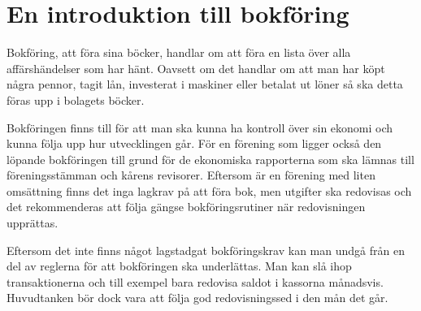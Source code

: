 \chapter{En introduktion till bokföring}
Bokföring, att föra sina böcker, handlar om att föra en lista över alla affärshändelser som har hänt. Oavsett om det handlar om att man har köpt några pennor, tagit lån, investerat i maskiner eller betalat ut löner så ska detta föras upp i bolagets böcker.

Bokföringen finns till för att man ska kunna ha kontroll över sin ekonomi och kunna följa upp hur utvecklingen går. För en förening som  ligger också den löpande bokföringen till grund för de ekonomiska rapporterna som ska lämnas till föreningsstämman och kårens revisorer. Eftersom  är en förening med liten omsättning finns det inga lagkrav på att föra bok, men utgifter ska redovisas och det rekommenderas att följa gängse bokföringsrutiner när redovisningen upprättas.


Eftersom det inte finns något lagstadgat bokföringskrav kan man undgå från en del av reglerna för att bokföringen ska underlättas. Man kan slå ihop transaktionerna och till exempel bara redovisa saldot i kassorna månadsvis. Huvudtanken bör dock vara att följa god redovisningssed i den mån det går.



